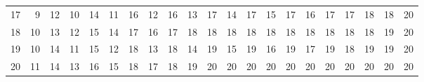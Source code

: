 \begin{tabular}{l|rrrrrrrrrrrrrrrrrrrr}
 17       &  9 & 12 & 10 & 14 & 11 & 16 & 12 & 16 & 13 & 17 & 14 & 17 & 15 & 17 & 16 & 17 & 17 & 18 & 18 & 20 \\
 18       & 10 & 13 & 12 & 15 & 14 & 17 & 16 & 17 & 18 & 18 & 18 & 18 & 18 & 18 & 18 & 18 & 18 & 18 & 19 & 20 \\
 19       & 10 & 14 & 11 & 15 & 12 & 18 & 13 & 18 & 14 & 19 & 15 & 19 & 16 & 19 & 17 & 19 & 18 & 19 & 19 & 20 \\
 20       & 11 & 14 & 13 & 16 & 15 & 18 & 17 & 18 & 19 & 20 & 20 & 20 & 20 & 20 & 20 & 20 & 20 & 20 & 20 & 20 \\
\hline
\end{tabular}

\pagebreak